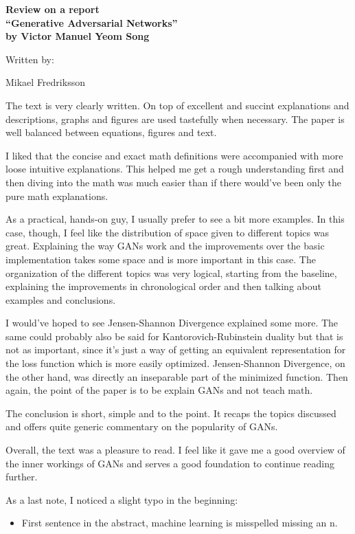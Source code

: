\documentclass[a4paper,11pt]{article}
\begin{document}
\pagestyle{empty}


  \begin{center}
{\large {\bf 
Review on a report \\
``Generative Adversarial Networks'' \\
by Victor Manuel Yeom Song} \\

\bigskip

Written by: 

Mikael Fredriksson
 } 
\end{center}

The text is very clearly written. On top of excellent and succint explanations and 
descriptions, graphs and figures are used tastefully when necessary. The paper is 
well balanced between equations, figures and text.

I liked that the concise and exact math definitions were accompanied with more
loose intuitive explanations. This helped me get a rough understanding first and 
then diving into the math was much easier than if there would've been only the
pure math explanations.

As a practical, hands-on guy, I usually prefer to see a bit more examples. In this case,
though, I feel like the distribution of space given to different topics was great.
Explaining the way GANs work and the improvements over the basic implementation takes 
some space and is more important in this case. The organization of the different
topics was very logical, starting from the baseline, explaining the improvements
in chronological order and then talking about examples and conclusions.

I would've hoped to see Jensen-Shannon Divergence explained some more.
The same could probably also be said for Kantorovich-Rubinstein duality but that is
not as important, since it's just a way of getting an equivalent representation
for the loss function which is more easily optimized. Jensen-Shannon Divergence, on
the other hand, was directly an inseparable part of the minimized function. Then
again, the point of the paper is to be explain GANs and not teach math.

The conclusion is short, simple and to the point. It recaps the topics discussed and
offers quite generic commentary on the popularity of GANs.

Overall, the text was a pleasure to read. I feel like it gave me a good overview
of the inner workings of GANs and serves a good foundation to continue reading further.


As a last note, I noticed a slight typo in the beginning:

\begin{itemize}
	
	\item First sentence in the abstract, machine learning is misspelled missing an n.

\end{itemize}
\end{document}
